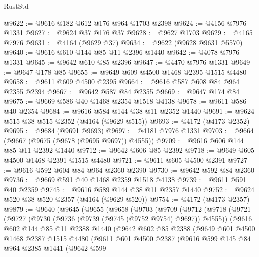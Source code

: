 \begin{lexlean}{RustStd}
\begin{coremodule}
@9622 := @9616 @182 @612 @176 @964 @1703 @2398
@9624 := @4156 @7976 @1331
@9627 := @9624 @37 @176 @37
@9628 := @9627 @1703
@9629 := @4165 @7976
@9631 := @4164 (@9629 @37)
@9634 := @9622 (@9628 @9631 @5570)
@9640 := @9616 @610 @144 @85 @11 @2396 @1440
@9642 := @4078 @7976 @1331
@9645 := @9642 @610 @85 @2396
@9647 := @4470 @7976 @1331
@9649 := @9647 @178 @85
@9655 := @9649 @609 @4500 @1468 @2395 @1515 @4480
@9658 := @9611 @609 @4500 @2395
@9664 := @9616 @587 @608 @84 @964 @2355 @2394
@9667 := @9642 @587 @84 @2355
@9669 := @9647 @174 @84
@9675 := @9669 @586 @40 @1468 @2354 @1518 @4138
@9678 := @9611 @586 @40 @2354
@9684 := @9616 @584 @144 @38 @11 @2352 @1440
@9691 := @9624 @515 @38 @515 @2352 (@4164 (@9629 @515))
@9693 := @4172 (@4173 @2352)
@9695 := @9684 (@9691 @9693)
@9697 := @4181 @7976 @1331
@9703 := @9664 (@9667 (@9675 (@9678 (@9695 @9697)) @4555))
@9709 := @9616 @606 @144 @85 @11 @2392 @1440
@9712 := @9642 @606 @85 @2392
@9718 := @9649 @605 @4500 @1468 @2391 @1515 @4480
@9721 := @9611 @605 @4500 @2391
@9727 := @9616 @592 @604 @84 @964 @2360 @2390
@9730 := @9642 @592 @84 @2360
@9736 := @9669 @591 @40 @1468 @2359 @1518 @4138
@9739 := @9611 @591 @40 @2359
@9745 := @9616 @589 @144 @38 @11 @2357 @1440
@9752 := @9624 @520 @38 @520 @2357 (@4164 (@9629 @520))
@9754 := @4172 (@4173 @2357)
@9879 := @9640
    (@9645
      (@9655
        (@9658
          (@9703
            (@9709
              (@9712
                (@9718
                  (@9721
                    (@9727
                      (@9730 (@9736 (@9739 (@9745 (@9752 @9754) @9697)) @4555))
                      (@9616
                        @602
                        @144
                        @85
                        @11
                        @2388
                        @1440
                        (@9642
                          @602
                          @85
                          @2388
                          (@9649
                            @601
                            @4500
                            @1468
                            @2387
                            @1515
                            @4480
                            (@9611
                              @601
                              @4500
                              @2387
                              (@9616
                                @599
                                @145
                                @84
                                @964
                                @2385
                                @1441
                                (@9642
                                  @599

\end{coremodule}
\end{lexlean}

